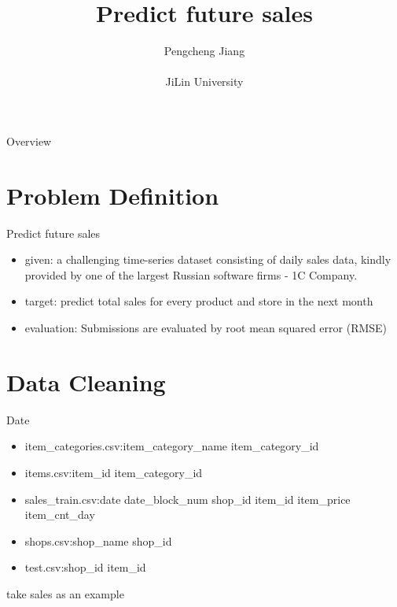 \documentclass[
 size=14pt,
 paper=smartboard,  %
 mode=present, 		%
 display=slides, 	%
 style=tuliplab,  	%
 pauseslide,
 fleqn,leqno]{powerdot}
\title{Predict future sales}
\author{
Pengcheng Jiang
\\
\\JiLin University
}
\date{\gitCommitterDate}
\begin{document}
\maketitle

\begin{slide}[toc=,bm=]{Overview}
\tableofcontents[content=currentsection,type=1]
\end{slide}

\section{Problem Definition}

\begin{slide}[toc=,bm=]{Predict future sales}
  \begin{center}
  \begin{itemize}
  \item given: a challenging time-series dataset consisting of daily sales data, kindly provided by one of the largest Russian software firms - 1C Company. 
  \item target: predict total sales for every product and store in the next month
  \item evaluation: Submissions are evaluated by root mean squared error (RMSE)
  \end{itemize}
  \end{center}
\end{slide}

\section{Data Cleaning}
\begin{slide}[toc=,bm=]{Date}
\begin{itemize}
  \item item_categories.csv:item_category_name	item_category_id\par
  \smallskip
  \item items.csv:item_id	item_category_id\par
  \item sales_train.csv:date  date_block_num  shop_id  item_id  item_price item_cnt_day\par
  \item shops.csv:shop_name	shop_id\par
  \item test.csv:shop_id  item_id\par
\end{itemize}
take sales as an example
\end{slide}
\end{document}
